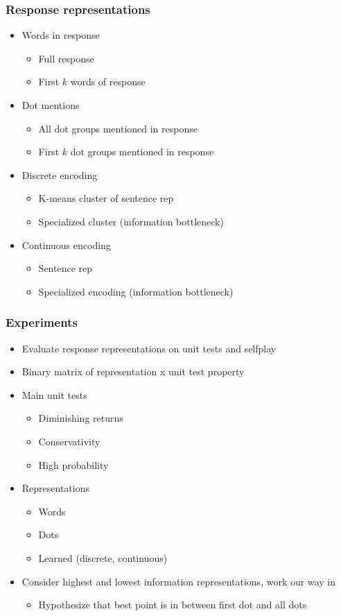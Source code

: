 \documentclass{beamer}
\begin{document}
\begin{frame}
\frametitle{Response representations}
\begin{itemize}
\item Words in response
    \begin{itemize}
    \item Full response
    \item First $k$ words of response
    \end{itemize}
\item Dot mentions
    \begin{itemize}
    \item All dot groups mentioned in response
    \item First $k$ dot groups mentioned in response
    \end{itemize}
\item Discrete encoding
    \begin{itemize}
    \item K-means cluster of sentence rep
    \item Specialized cluster (information bottleneck)
    \end{itemize}
\item Continuous encoding
    \begin{itemize}
    \item Sentence rep
    \item Specialized encoding (information bottleneck)
    \end{itemize}
\end{itemize}
\end{frame}

\begin{frame}
\frametitle{Experiments}
\begin{itemize}
\item Evaluate response representations on unit tests and selfplay
\item Binary matrix of representation x unit test property
\item Main unit tests
    \begin{itemize}
    \item Diminishing returns
    \item Conservativity
    \item High probability
    \end{itemize}
\item Representations
    \begin{itemize}
    \item Words
    \item Dots
    \item Learned (discrete, continuous)
    \end{itemize}
\item Consider highest and lowest information representations,
    work our way in
    \begin{itemize}
    \item Hypothesize that best point is in between first dot and all dots
    \end{itemize}
\end{itemize}
\end{frame}
\end{document}
